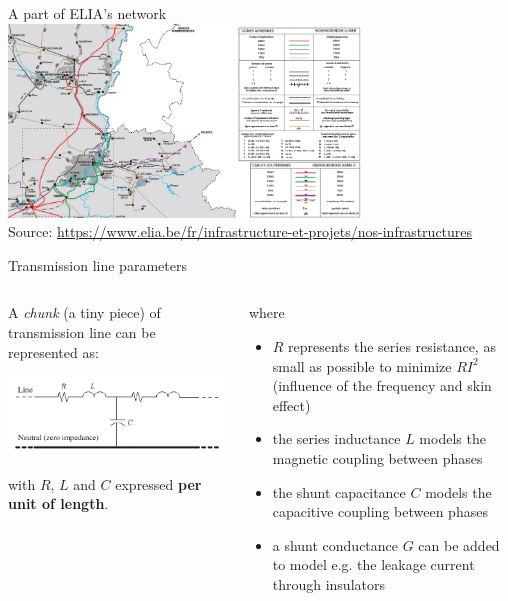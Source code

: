 \begin{frame}{A part of ELIA's network}
    \centering
    \includegraphics[width=0.7\textwidth]{images/carte_ELIA_2019_Liege.png}\\
    Source: \href{https://www.elia.be/fr/infrastructure-et-projets/nos-infrastructures}{https://www.elia.be/fr/infrastructure-et-projets/nos-infrastructures}
\end{frame}

\begin{frame}{Transmission line parameters}
\begin{columns}
    \begin{column}{0.5\textwidth}
    A \textit{chunk} (a tiny piece)  of transmission line can be represented as:
    \begin{center}
        \includegraphics[width=\textwidth]{images/TL_1.png}
    \end{center}
    with $R$, $L$ and $C$ expressed \textbf{per unit of length}.
    \end{column}
    \begin{column}{0.5\textwidth}
    where
    \begin{itemize}
        \item $R$ represents the series resistance, as small as possible to minimize $RI^2$ (influence of the frequency and skin effect)
        \item the series inductance $L$ models the magnetic coupling between phases
        \item the shunt capacitance $C$ models the capacitive coupling between phases
        \item a shunt conductance $G$ can be added to model e.g. the leakage current through insulators
    \end{itemize}
    \end{column}
\end{columns}
\end{frame}

